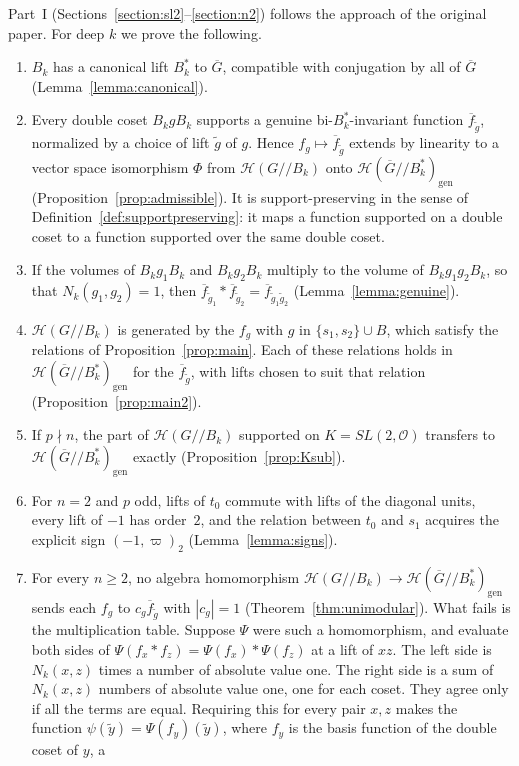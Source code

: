 \documentclass[12pt,letterpaper]{amsart}
\numberwithin{equation}{section}
\theoremstyle{definition}
\theoremstyle{remark}
\newcommand{\cO}{\mathcal{O}}
\newcommand{\cH}{\mathcal{H}}
\newcommand{\Gbar}{\overline{G}}
\newcommand{\gen}{\mathrm{gen}}
\newcommand{\fbar}{\overline{f}}
\newcommand{\Hgen}{\cH(\Gbar/\!/B_k^*)_{\gen}}
\newcommand{\Hlin}{\cH(G/\!/B_k)}
\begin{document}
Part~I (Sections~\ref{section:sl2}--\ref{section:n2}) follows the
approach of the original paper. For deep $k$ we prove the following.
\begin{enumerate}[leftmargin=2em]
\item $B_k$ has a canonical lift $B_k^*$ to $\Gbar$, compatible with
conjugation by all of $\Gbar$ (Lemma~\ref{lemma:canonical}).
\item Every double coset $B_kgB_k$ supports a genuine
bi-$B_k^*$-invariant function $\fbar_{\tilde g}$, normalized by a
choice of lift $\tilde g$ of $g$. Hence $f_g\mapsto\fbar_{\tilde g}$
extends by linearity to a vector space isomorphism $\Phi$ from $\Hlin$
onto $\Hgen$ (Proposition~\ref{prop:admissible}). It is support-preserving in the
sense of Definition~\ref{def:supportpreserving}: it maps a function
supported on a double coset to a function supported over the same
double coset.
\item If the volumes of $B_kg_1B_k$ and $B_kg_2B_k$ multiply to the
volume of $B_kg_1g_2B_k$, so that $N_k(g_1,g_2)=1$, then
$\fbar_{\tilde g_1}*\fbar_{\tilde g_2}=\fbar_{\tilde g_1\tilde g_2}$
(Lemma~\ref{lemma:genuine}).
\item $\Hlin$ is generated by the $f_g$ with $g$ in
$\{s_1,s_2\}\cup B$, which satisfy the relations of
Proposition~\ref{prop:main}. Each of these relations holds in $\Hgen$
for the $\fbar_{\tilde g}$, with lifts chosen to suit that relation
(Proposition~\ref{prop:main2}).
\item If $p\nmid n$, the part of $\Hlin$ supported on $K=SL(2,\cO)$
transfers to $\Hgen$ exactly (Proposition~\ref{prop:Ksub}).
\item For $n=2$ and $p$ odd, lifts of $t_0$ commute with lifts of the
diagonal units, every lift of $-1$ has order~$2$, and the relation
between $t_0$ and $s_1$ acquires the explicit sign $(-1,\varpi)_2$
(Lemma~\ref{lemma:signs}).
\item For every $n\geq 2$, no algebra homomorphism $\Hlin\to\Hgen$
sends each $f_g$ to $c_g\fbar_{\tilde g}$ with $|c_g|=1$
(Theorem~\ref{thm:unimodular}). What fails is the multiplication
table. Suppose $\Psi$ were such a homomorphism, and evaluate both sides
of $\Psi(f_x*f_z)=\Psi(f_x)*\Psi(f_z)$ at a lift of $xz$. The left side
is $N_k(x,z)$ times a number of absolute value one. The right side is a
sum of $N_k(x,z)$ numbers of absolute value one, one for each coset.
They agree only if all the terms are equal. Requiring this for every
pair $x,z$ makes the function $\psi(\tilde y)=\Psi(f_y)(\tilde y)$,
where $f_y$ is the basis function of the double coset of $y$, a

\end{enumerate}
\end{document}
